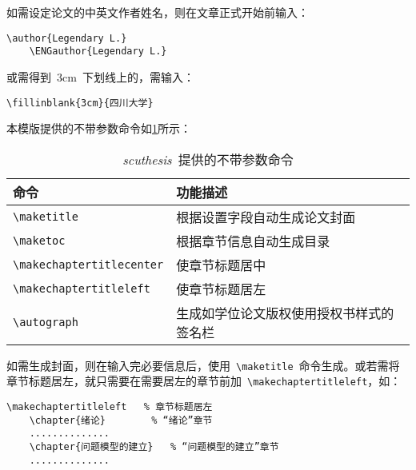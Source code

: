 如需设定论文的中英文作者姓名，则在文章正式开始前输入：
\begin{Verbatim}[gobble=1,frame=single]
	\author{Legendary L.}
	\ENGauthor{Legendary L.}
\end{Verbatim}


或需得到~3cm~下划线上的，需输入：
\begin{Verbatim}[gobble=1,frame=single]
	\fillinblank{3cm}{四川大学}
\end{Verbatim}


本模版提供的不带参数命令如\cref{table_ProvidedCommandsWithoutPar}所示：
\begin{table}[h]
	\caption{\emph{scuthesis}~提供的不带参数命令}
	\label{table_ProvidedCommandsWithoutPar}
	\begin{tabular*}{\textwidth}{l@{\extracolsep{\fill}}p{}}
		\toprule
		\textbf{命令} & \textbf{功能描述} \\
		\midrule
		\verb|\maketitle| & 根据设置字段自动生成论文封面\\
		\verb|\maketoc| & 根据章节信息自动生成目录\\
		\verb|\makechaptertitlecenter| & 使章节标题居中\\
		\verb|\makechaptertitleleft| & 使章节标题居左\\
		\verb|\autograph| & 生成如学位论文版权使用授权书样式的签名栏\\
		\bottomrule
	\end{tabular*}
\end{table}


如需生成封面，则在输入完必要信息后，使用~\verb|\maketitle|~命令生成。或若需将章节标题居左，就只需要在需要居左的章节前加~\verb|\makechaptertitleleft|，如：
\begin{Verbatim}[gobble=1,frame=single]
	\makechaptertitleleft	% 章节标题居左
	\chapter{绪论}		% “绪论”章节
	..............
	\chapter{问题模型的建立}	% “问题模型的建立”章节
	..............
\end{Verbatim}

